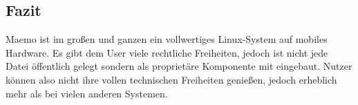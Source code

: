 \subsection{Fazit}
Maemo ist im großen und ganzen ein vollwertiges Linux-System auf mobiles Hardware. Es gibt dem User viele rechtliche Freiheiten, jedoch ist nicht jede Datei öffentlich gelegt sondern als proprietäre Komponente mit eingebaut. Nutzer können also nicht ihre vollen technischen Freiheiten genießen, jedoch erheblich mehr als bei vielen anderen Systemen.